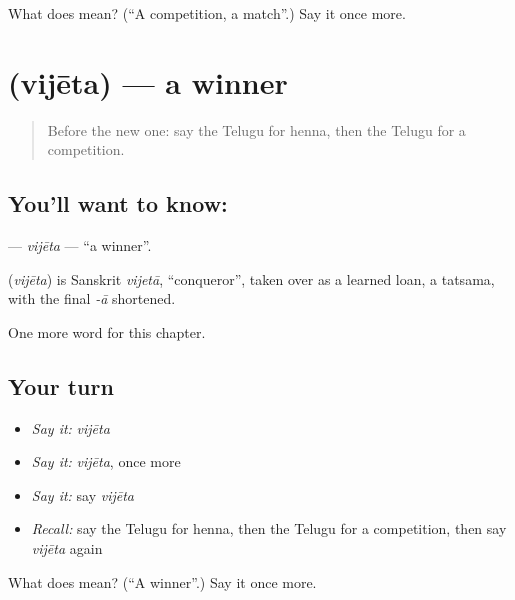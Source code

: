 \begin{tcolorbox}[breakable,colback=teal!4,colframe=teal!35!black,title={Before you move on}]
What does  mean? (\textquotedblleft{}A competition, a match\textquotedblright{}.) Say it once more.
\end{tcolorbox}
\section[\texorpdfstring{\te{విజేత} (vijēta)}{విజేత (vijēta)}]{ (vijēta) — a winner}

\label{lesson:TE-C189-vijeta}



\begin{quote}
Before the new one: say the Telugu for henna, then the Telugu for a competition.
\end{quote}

\subsection*{You'll want to know: }
\textbf{} — \emph{vijēta} — \textquotedblleft{}a winner\textquotedblright{}.

\begin{cousinweb}
\textbf{} (\emph{vijēta}) is Sanskrit \emph{vijetā}, \textquotedblleft{}conqueror\textquotedblright{}, taken over as a learned loan, a tatsama, with the final \emph{-ā} shortened.
\end{cousinweb}

\begin{grammarlens}[title={What you've built}]
One more word for this chapter.
\end{grammarlens}

\subsection*{Your turn}
\begin{itemize}
\raggedright
  \item \emph{Say it:} \emph{vijēta}
  \item \emph{Say it:} \emph{vijēta}, once more
  \item \emph{Say it:} say \emph{vijēta}
  \item \emph{Recall:} say the Telugu for henna, then the Telugu for a competition, then say \emph{vijēta} again
\end{itemize}

\begin{tcolorbox}[breakable,colback=teal!4,colframe=teal!35!black,title={Before you move on}]
What does  mean? (\textquotedblleft{}A winner\textquotedblright{}.) Say it once more.
\end{tcolorbox}
